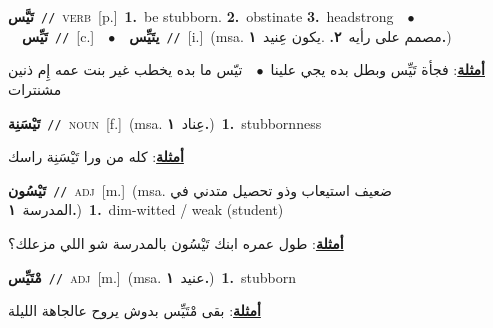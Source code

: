 \documentclass[10pt,a4paper,twoside]{article} %
\begin{document}
\begin{multicols}{2}
{\setlength\topsep{0pt}\textbf{\foreignlanguage{arabic}{تَيَّس}}\ {\color{gray}\texttt{//}\color{black}}\ \textsc{verb}\ [p.]\ \textbf{1.}~be stubborn.  \textbf{2.}~obstinate  \textbf{3.}~headstrong\ \ $\bullet$\ \ \setlength\topsep{0pt}\textbf{\foreignlanguage{arabic}{تَيِّس}}\ {\color{gray}\texttt{//}\color{black}}\ [c.]\ \ $\bullet$\ \ \setlength\topsep{0pt}\textbf{\foreignlanguage{arabic}{يتَيِّس}}\ {\color{gray}\texttt{//}\color{black}}\ [i.]\ \color{gray}(msa. \foreignlanguage{arabic}{مصمم على رأيه}~\foreignlanguage{arabic}{\textbf{٢.}}  .\foreignlanguage{arabic}{يكون عِنيد}~\foreignlanguage{arabic}{\textbf{١.}})\color{black}\  \begin{flushright}\color{gray}\foreignlanguage{arabic}{\textbf{\underline{\foreignlanguage{arabic}{أمثلة}}}: فجأة تَيِّس وبطل بده يجي علينا\ $\bullet$\ \  تيّس ما بده يخطب غير بنت عمه إِم ذنين مشنترات}\end{flushright}\color{black}} \vspace{2mm}

{\setlength\topsep{0pt}\textbf{\foreignlanguage{arabic}{تَيْسَنِة}}\ {\color{gray}\texttt{//}\color{black}}\ \textsc{noun}\ [f.]\ \color{gray}(msa. \foreignlanguage{arabic}{عِناد}~\foreignlanguage{arabic}{\textbf{١.}})\color{black}\ \textbf{1.}~stubbornness\  \begin{flushright}\color{gray}\foreignlanguage{arabic}{\textbf{\underline{\foreignlanguage{arabic}{أمثلة}}}: كله من ورا تَيْسَنِة راسك}\end{flushright}\color{black}} \vspace{2mm}

{\setlength\topsep{0pt}\textbf{\foreignlanguage{arabic}{تَيْسُون}}\ {\color{gray}\texttt{//}\color{black}}\ \textsc{adj}\ [m.]\ \color{gray}(msa. \foreignlanguage{arabic}{ضعيف استيعاب وذو تحصيل متدني في المدرسة}~\foreignlanguage{arabic}{\textbf{١.}})\color{black}\ \textbf{1.}~dim-witted / weak (student)\  \begin{flushright}\color{gray}\foreignlanguage{arabic}{\textbf{\underline{\foreignlanguage{arabic}{أمثلة}}}: طول عمره ابنك تَيْسُون بالمدرسة شو اللي مزعلك؟}\end{flushright}\color{black}} \vspace{2mm}

{\setlength\topsep{0pt}\textbf{\foreignlanguage{arabic}{مْتَيِّس}}\ {\color{gray}\texttt{//}\color{black}}\ \textsc{adj}\ [m.]\ \color{gray}(msa. \foreignlanguage{arabic}{عنيد}~\foreignlanguage{arabic}{\textbf{١.}})\color{black}\ \textbf{1.}~stubborn\  \begin{flushright}\color{gray}\foreignlanguage{arabic}{\textbf{\underline{\foreignlanguage{arabic}{أمثلة}}}: بقى مْتَيِّس بدوش يروح عالجاهة الليلة}\end{flushright}\color{black}} \vspace{2mm}


\end{multicols}
\end{document}
